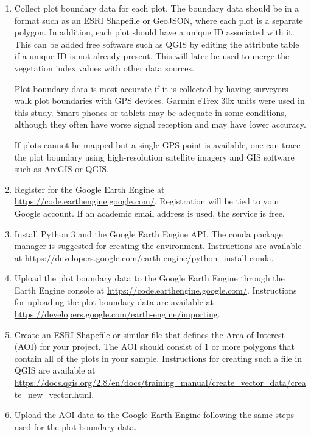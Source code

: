 \documentclass{article}
\begin{document}
\begin{enumerate}
  \item Collect plot boundary data for each plot. The boundary data should be in a format such as an ESRI Shapefile or GeoJSON, where each plot is a separate polygon. In addition, each plot should have a unique ID associated with it. This can be added free software such as QGIS by editing the attribute table if a unique ID is not already present. This will later be used to merge the vegetation index values with other data sources. 

  Plot boundary data is most accurate if it is collected by having surveyors walk plot boundaries with GPS devices. Garmin eTrex 30x units were used in this study. Smart phones or tablets may be adequate in some conditions, although they often have worse signal reception and may have lower accuracy. 

  If plots cannot be mapped but a single GPS point is available, one can trace the plot boundary using high-resolution satellite imagery and GIS software such as ArcGIS or QGIS. 

  \item Register for the Google Earth Engine at \url{https://code.earthengine.google.com/}. Registration will be tied to your Google account. If an academic email address is used, the service is free. 

  \item Install Python 3 and the Google Earth Engine API. The conda package manager is suggested for creating the environment. Instructions are available at \url{https://developers.google.com/earth-engine/python_install-conda}. 

  \item Upload the plot boundary data to the Google Earth Engine through the Earth Engine console at \url{https://code.earthengine.google.com/}. Instructions for uploading the plot boundary data are available at \url{https://developers.google.com/earth-engine/importing}. 

  \item Create an ESRI Shapefile or similar file that defines the Area of Interest (AOI) for your project. The AOI should consist of 1 or more polygons that contain all of the plots in your sample. Instructions for creating such a file in QGIS are available at \url{https://docs.qgis.org/2.8/en/docs/training_manual/create_vector_data/create_new_vector.html}. 

  \item Upload the AOI data to the Google Earth Engine following the same steps used for the plot boundary data. 


\end{enumerate}
\end{document}
